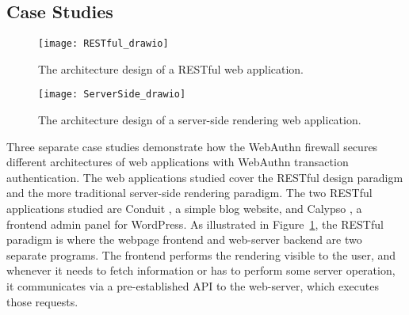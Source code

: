 
\subsection{Case Studies}

\begin{figure}[h]
  \centering
  \texttt{[image: RESTful\_drawio]}
  \caption{The architecture design of a RESTful web application.}
  \label{Fig:CaseStudiesRESTful}
\end{figure}

\begin{figure}[h]
  \centering
  \texttt{[image: ServerSide\_drawio]}
  \caption{The architecture design of a server-side rendering web application.}
  \label{Fig:CaseStudiesServerSide}
\end{figure}

Three separate case studies demonstrate how the WebAuthn firewall secures different architectures of web applications with WebAuthn transaction authentication. The web applications studied cover the RESTful design paradigm and the more traditional server-side rendering paradigm. The two RESTful applications studied are Conduit \cite{conduit}, a simple blog website, and Calypso \cite{calypso}, a frontend admin panel for WordPress. As illustrated in Figure~\ref{Fig:CaseStudiesRESTful}, the RESTful paradigm is where the webpage frontend and web-server backend are two separate programs. The frontend performs the rendering visible to the user, and whenever it needs to fetch information or has to perform some server operation, it communicates via a pre-established API to the web-server, which executes those requests. 

